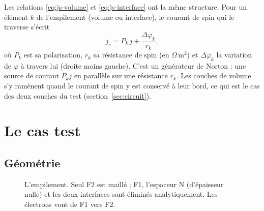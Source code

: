 \documentclass[11pt,a4paper]{article}
\newcommand{\vm}{\bm{m}}
\begin{document}
Les relations \eqref{eq:js-volume} et \eqref{eq:js-interface} ont la
même structure. Pour un élément $k$ de l'empilement (volume ou
interface), le courant de spin qui le traverse s'écrit
\begin{equation}
  j_s = P_k\,j + \frac{\Delta\varphi_k}{r_k},
  \label{eq:element}
\end{equation}
où $P_k$ est sa polarisation, $r_k$ sa résistance de spin (en
$\Omega\,$m$^2$) et $\Delta\varphi_k$ la variation de $\varphi$ à travers lui (droite moins gauche).
C'est un générateur de Norton : une source de courant $P_kj$ en parallèle
sur une résistance $r_k$. Les couches de volume s'y ramènent quand le courant de
spin y est conservé à leur bord, ce qui est le cas des deux couches du
test (section~\ref{sec:circuit}).

\section{Le cas test}

\subsection{Géométrie}

\begin{figure}[h]
\centering
{}
\caption{L'empilement. Seul F2 est maillé ; F1, l'espaceur N (d'épaisseur
  nulle) et les deux interfaces sont éliminés analytiquement. Les
  électrons vont de F1 vers F2.}
\label{fig:empilement}
\end{figure}
\end{document}
